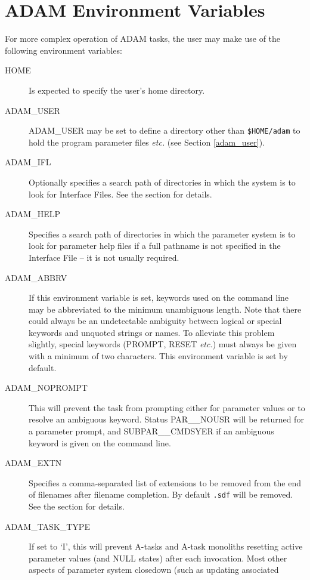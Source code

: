 \documentclass[twoside,11pt,nolof]{starlink}
\begin{document}
\newpage
\section{\label{envars}ADAM Environment Variables}
For more complex operation of ADAM tasks, the user may make use of the following
environment variables:
\begin{description}
\item[HOME] Is expected to specify the user's home directory.
\item[ADAM\_USER]
ADAM\_USER may be set to define a directory other than \texttt{\$HOME/adam}
to hold the program parameter files \textit{etc.} (see Section \ref{adam_user}).
\item[ADAM\_IFL] Optionally specifies a search path of directories in
which the system is to look for Interface Files.
See the
section for details.
\item[ADAM\_HELP] Specifies a search path of
directories in which the parameter system is to look for parameter help files
if a full pathname is not specified in the Interface File -- it is not
usually required.
\item[ADAM\_ABBRV]
If this environment variable is set, keywords used on the
command line may be abbreviated to the minimum unambiguous length.
Note that there could always be an undetectable ambiguity between logical or
special keywords and unquoted strings or names. To alleviate this problem
slightly, special keywords (PROMPT, RESET \textit{etc.}) must always be given
with a minimum of two characters. This environment variable is set by default.
\item[ADAM\_NOPROMPT] This will prevent the task from prompting either for
parameter values or to resolve an ambiguous keyword. Status PAR\_\_NOUSR will
be returned for a parameter prompt, and SUBPAR\_\_CMDSYER if an ambiguous
keyword is given on the command line.
\item[ADAM\_EXTN]
Specifies a comma-separated list of extensions to be removed from the end
of filenames after filename completion. By default \texttt{.sdf} will be
removed.
See the
section for details.
\item[ADAM\_TASK\_TYPE]
If set to `I', this will prevent A-tasks and A-task monoliths
resetting active parameter values (and NULL states) after each invocation.
Most other aspects of parameter system closedown (such as updating associated

\end{description}
\end{document}
